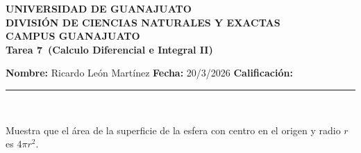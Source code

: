\documentclass[12pt,a4paper]{article}
\newcommand{\alumno}{Ricardo León Martínez}
\newcommand{\materia}{Calculo Diferencial e Integral II}
\newcommand{\tarea}{Tarea 7}
\newcommand{\fecha}{20/3/2026}
\begin{document}
    \begin{center}
    {\large\textbf{UNIVERSIDAD DE GUANAJUATO}}\\[0.3cm]
    {\normalsize\textbf{DIVISIÓN DE CIENCIAS NATURALES Y EXACTAS}}\\
    {\normalsize\textbf{CAMPUS GUANAJUATO}}\\[1cm]

    {\Large\textbf{\tarea\ (\materia)}}\\[1cm]
    \end{center}

    \textbf{Nombre:} \alumno \hfill 
    \textbf{Fecha:} \fecha \hfill 
    \textbf{Calificación:} \rule{3cm}{0.4pt} \\[0.3cm]

    \begin{mdframed}[style=mdbluebox,frametitle={Ejercicio 1}]
        Muestra que el área de la superficie de la esfera con centro en el origen y radio $r$ es
        $4\pi r^{2}$.
    \end{mdframed}
\end{document}
